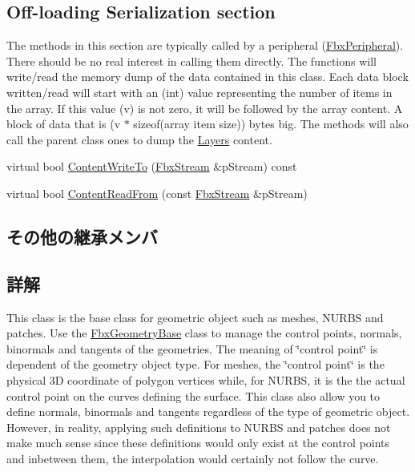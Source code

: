 \subsection*{Off-\/loading Serialization section}
\label{_amgrpe1aaec84f361fca191ade63ad8637b37}%
 The methods in this section are typically called by a peripheral (\hyperlink{class_fbx_peripheral}{Fbx\+Peripheral}). There should be no real interest in calling them directly. The functions will write/read the memory dump of the data contained in this class. Each data block written/read will start with an (int) value representing the number of items in the array. If this value (v) is not zero, it will be followed by the array content. A block of data that is (v $\ast$ sizeof(array item size)) bytes big. The methods will also call the parent class ones to dump the \hyperlink{namespace_layers}{Layers} content. \begin{DoxyCompactItemize}
\item 
virtual bool \hyperlink{class_fbx_geometry_base_a7b80ccbcd2b15bbedbe7dd7e0739a3b3}{Content\+Write\+To} (\hyperlink{class_fbx_stream}{Fbx\+Stream} \&p\+Stream) const
\item 
virtual bool \hyperlink{class_fbx_geometry_base_a6d34ab23d253b07cac24267177096c1a}{Content\+Read\+From} (const \hyperlink{class_fbx_stream}{Fbx\+Stream} \&p\+Stream)
\end{DoxyCompactItemize}
\subsection*{その他の継承メンバ}


\subsection{詳解}
This class is the base class for geometric object such as meshes, N\+U\+R\+BS and patches. Use the \hyperlink{class_fbx_geometry_base}{Fbx\+Geometry\+Base} class to manage the control points, normals, binormals and tangents of the geometries. The meaning of \char`\"{}control point\char`\"{} is dependent of the geometry object type. For meshes, the \char`\"{}control point\char`\"{} is the physical 3D coordinate of polygon vertices while, for N\+U\+R\+BS, it is the the actual control point on the curves defining the surface. This class also allow you to define normals, binormals and tangents regardless of the type of geometric object. However, in reality, applying such definitions to N\+U\+R\+BS and patches does not make much sense since these definitions would only exist at the control points and inbetween them, the interpolation would certainly not follow the curve.

